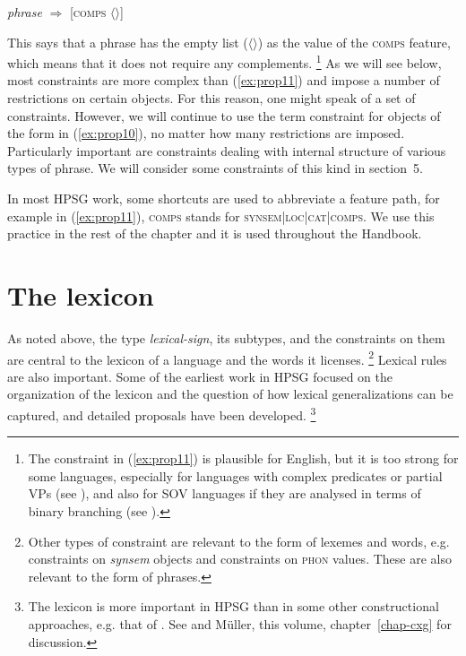 \documentclass[output=paper
	        ,collection
	        ,collectionchapter
 	        ,biblatex
                ,babelshorthands
                ,newtxmath
                ,draftmode
                ,colorlinks, citecolor=brown
]{langscibook}
\begin{document}
\ea\label{ex:prop11}
\emph{phrase} $\Rightarrow$ [\textsc{comps} $\langle \rangle$]
\z

This says that a phrase has the empty list ($\langle \rangle$) as the value of the \textsc{comps} feature, which means that it does not require any complements.%
%
\footnote{The constraint in (\ref{ex:prop11}) is plausible for English, but it is too strong for some languages, especially for languages with complex predicates or partial VPs (see ), and also for SOV languages if they are analysed in terms of binary branching (see ).}
%
As we will see below, most constraints are more complex than (\ref{ex:prop11}) and impose a number of restrictions on certain objects. For this reason, one might speak of a set of constraints. However, we will continue to use the term constraint for objects of the form in (\ref{ex:prop10}), no matter how many restrictions are imposed. Particularly important are constraints dealing with internal structure of various types of phrase. We will consider some constraints of this kind in section~5.

In most HPSG work, some shortcuts are used to abbreviate a feature path, for example in (\ref{ex:prop11}), \textsc{comps} stands for \textsc{synsem|loc|cat|comps}. We use this practice in the rest of the chapter and it is used throughout the Handbook.


\section{The lexicon}

As noted above, the type \emph{lexical-sign}, its subtypes, and the constraints on them are central to the lexicon of a language and the words it licenses.%
%
\footnote{Other types of constraint are relevant to the form of lexemes and words, e.g. constraints on \emph{synsem} objects and constraints on \textsc{phon} values. These are also relevant to the form of phrases.}
%
Lexical rules are also important. Some of the earliest work in HPSG focused on the organization of the lexicon and the question of how lexical generalizations can be captured, and detailed proposals have been developed.%
%
\footnote{The lexicon is more important in HPSG than in some other constructional approaches, e.g. that of \citet{Goldberg95a,Goldberg2006a}. See \citet{MWArgSt} and Müller, this volume, chapter~\ref{chap-cxg} for discussion.}
%
\end{document}
